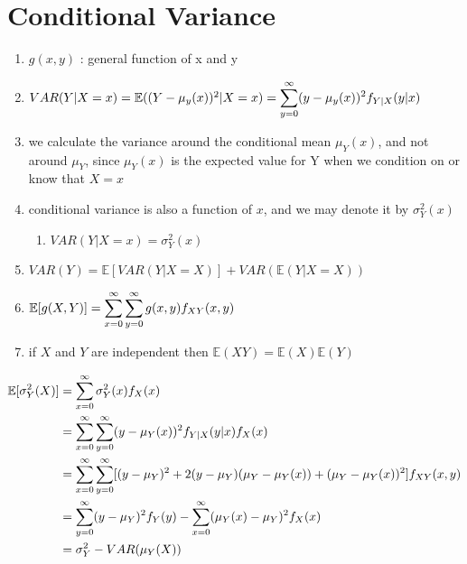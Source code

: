 \section{Conditional Variance \cite{ism-1}} \label{Multivariate Distributions: Conditional Variance}

\begin{enumerate}
    \item[] $g(x, y)$ : general function of x and y

    \item[] $
        VAR(Y|X=x) 
        = \mathbb{E}((Y-\mu_y(x))^2|X=x)
        = \displaystyle\sum_{y=0}^\infty
        (y-\mu_y(x))^2 f_{Y|X}(y|x)
    $

    \item we calculate the variance around the conditional mean $\mu _Y(x)$, and not around $\mu _Y$, since $\mu _Y(x)$ is the expected value for Y when we condition on or know that $X = x$

    \item conditional variance is also a function of $x$, and we may denote it by $\sigma _Y^2(x)$
    \begin{enumerate}
        \item[] $VAR(Y|X=x) = \sigma _Y^2(x)$

    \end{enumerate}

    \item $VAR(Y) = \mathbb{E}[VAR(Y|X = X)] + VAR(\mathbb{E}(Y|X = X))$

    \item $
        \mathbb{E}[g(X,Y)]
        =\displaystyle\sum_{x=0}^{\infty}
            \displaystyle\sum_{y=0}^{\infty}
            g(x,y) f_{XY}(x,y)
    $

    \item if $X$ and $Y$ are independent then $\mathbb{E}(XY) = \mathbb{E}(X)\mathbb{E}(Y)$
\end{enumerate}

\begin{align*}
    \mathbb{E}[\sigma^2_Y(X)]
    &= \displaystyle\sum_{x=0}^{\infty}
        \sigma_Y^2(x)f_X(x)\\
    &= \displaystyle\sum_{x=0}^{\infty}
        \displaystyle\sum_{y=0}^{\infty}
        (y - \mu_Y (x))^2 f_{Y |X} (y|x) f_X (x)\\
    &= \displaystyle\sum_{x=0}^{\infty}
        \displaystyle\sum_{y=0}^{\infty}
        [(y - \mu_Y ) ^2 + 2(y - \mu_Y )(\mu_Y - \mu_Y (x)) + (\mu_Y - \mu_Y (x))^2] f_{XY} (x, y)\\
    &= \displaystyle\sum_{y=0}^{\infty} 
        (y - \mu_Y )^2 f_Y (y) 
        - \displaystyle\sum_{x=0}^{\infty} 
        (\mu_Y (x) - \mu_Y ) ^2 f_X (x)\\
    &= \sigma_Y^2 - VAR(\mu_Y(X))
\end{align*}

